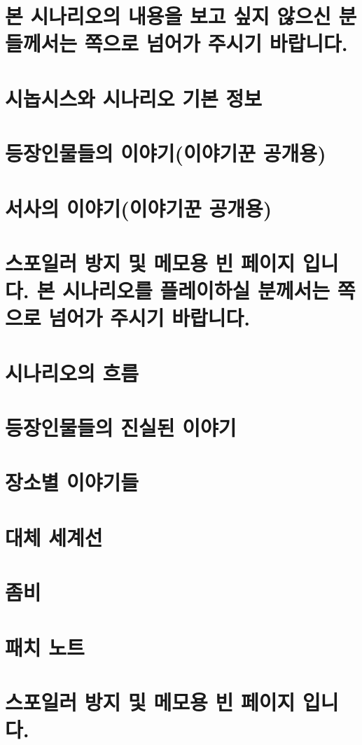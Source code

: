 \documentclass{report}
\begin{document}
	\chapter*{본 시나리오의 내용을 보고 싶지 않으신 분들께서는 \pageref{endof_Unliving}쪽으로 넘어가 주시기 바랍니다.}
	
	\chapter{시놉시스와 시나리오 기본 정보}
		
	
	\chapter{등장인물들의 이야기(이야기꾼 공개용)}
		
	
	\chapter{서사의 이야기(이야기꾼 공개용)}
		
	
	\chapter*{스포일러 방지 및 메모용 빈 페이지 입니다. 본 시나리오를 플레이하실 분께서는 \pageref{endof_Unliving}쪽으로 넘어가 주시기 바랍니다.}
	
	\parttoc
	
	\chapter{시나리오의 흐름}
		
	
	\chapter{등장인물들의 진실된 이야기}
		
	
	\chapter{장소별 이야기들}
		
	
	\chapter{대체 세계선}
		
	
	\chapter{좀비}
		
		
	\chapter{패치 노트}
		
		
	\chapter*{스포일러 방지 및 메모용 빈 페이지 입니다.}
\end{document}
